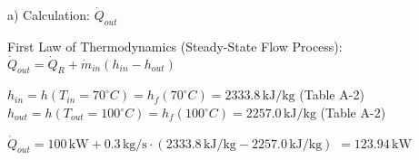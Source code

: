 a) Calculation: \( \dot{Q}_{out} \)  

First Law of Thermodynamics (Steady-State Flow Process):  
\( \dot{Q}_{out} = \dot{Q}_R + \dot{m}_{in} (h_{in} - h_{out}) \)  

\( h_{in} = h(T_{in} = 70^\circ C) = h_f(70^\circ C) = 2333.8 \, \text{kJ/kg} \) (Table A-2)  
\( h_{out} = h(T_{out} = 100^\circ C) = h_f(100^\circ C) = 2257.0 \, \text{kJ/kg} \) (Table A-2)  

\( \dot{Q}_{out} = 100 \, \text{kW} + 0.3 \, \text{kg/s} \cdot (2333.8 \, \text{kJ/kg} - 2257.0 \, \text{kJ/kg}) \)  
\( = 123.94 \, \text{kW} \)